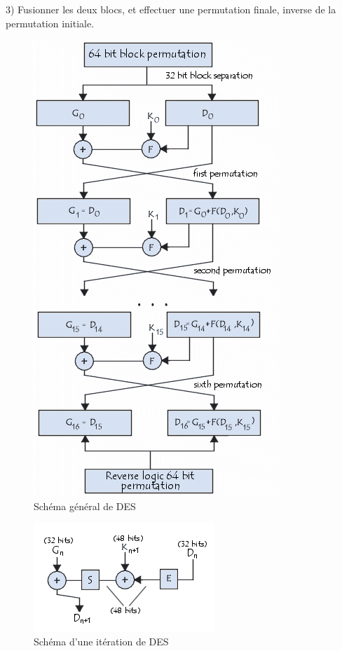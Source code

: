 \documentclass[a4paper,12pt]{article}
\begin{document}
3) Fusionner les deux blocs, et effectuer une permutation finale, inverse de la permutation initiale.

\begin{figure}[h]
\centering
\includegraphics[scale=0.80]{./images/DES_diagram.png}
\caption{Schéma général de DES}
\label{fig:DES-diagram}
\end{figure}

\clearpage

\begin{figure}[h]
\centering
\includegraphics[scale=0.80]{./images/DES_round.png}
\caption{Schéma d'une itération de DES}
\label{fig:DES-round}
\end{figure}
\end{document}
